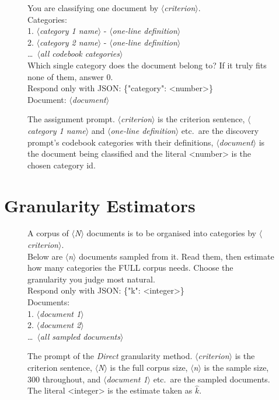 \documentclass[11pt,a4paper,oneside]{report}
\newcommand{\ph}[1]{\textcolor{blue!60!black}{\rmfamily\itshape $\langle$#1$\rangle$}}
\begin{document}
\begin{figure}[htbp]
\begin{promptbox}
\small\ttfamily
You are classifying one document by \ph{criterion}.\\[4pt]
Categories:\\
1. \ph{category 1 name} - \ph{one-line definition}\\
2. \ph{category 2 name} - \ph{one-line definition}\\
\ldots\ \ph{all codebook categories}\\[4pt]
Which single category does the document belong to? If it truly fits none of them, answer 0.\\
Respond only with JSON: \{"category": <number>\}\\[4pt]
Document: \ph{document}
\end{promptbox}
\caption[Assignment prompt]{The assignment prompt. \ph{criterion} is the criterion sentence, \ph{category 1 name} and \ph{one-line definition} etc.\ are the discovery prompt's codebook categories with their definitions, \ph{document} is the document being classified and the literal {\small\ttfamily <number>} is the chosen category id.}
\label{fig:prompt-assign}
\end{figure}

\FloatBarrier

\section{Granularity Estimators}\label{app:prompts-granularity}

\begin{figure}[htbp]
\begin{promptbox}
\small\ttfamily
A corpus of \ph{N} documents is to be organised into categories by \ph{criterion}.\\[4pt]
Below are \ph{n} documents sampled from it. Read them, then estimate how many categories the FULL corpus needs. Choose the granularity you judge most natural.\\
Respond only with JSON: \{"k": <integer>\}\\[4pt]
Documents:\\
1. \ph{document 1}\\
2. \ph{document 2}\\
\ldots\ \ph{all sampled documents}
\end{promptbox}
\caption[Direct granularity prompt]{The prompt of the \textit{Direct} granularity method. \ph{criterion} is the criterion sentence, \ph{N} is the full corpus size, \ph{n} is the sample size, 300 throughout, and \ph{document 1} etc.\ are the sampled documents. The literal {\small\ttfamily <integer>} is the estimate taken as $\hat{k}$.}
\label{fig:prompt-direct}
\end{figure}
\end{document}
